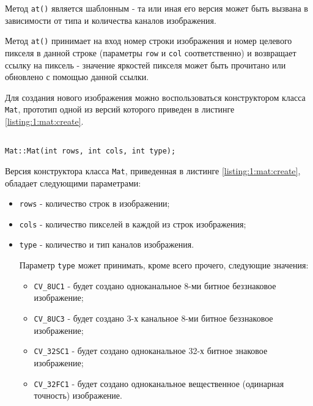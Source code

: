 Метод \verb|at()| является шаблонным - та или иная его версия может быть вызвана в зависимости от типа и количества каналов изображения.

Метод \verb|at()| принимает на вход номер строки изображения и номер целевого пикселя в данной строке (параметры \verb|row| и \verb|col| соответственно) и возвращает ссылку на пиксель - значение яркостей пикселя может быть прочитано или обновлено с помощью данной ссылки.


Для создания нового изображения можно воспользоваться конструктором класса \verb|Mat|, прототип одной из версий которого приведен в листинге \ref{listing:1:mat:create}.

\begin{lstlisting}

Mat::Mat(int rows, int cols, int type);

\end{lstlisting}
\mylistingend

Версия конструктора класса \verb|Mat|, приведенная в листинге \ref{listing:1:mat:create}, обладает следующими параметрами:

\begin{itemize}

	\item \verb|rows| - количество строк в изображении;
	\item \verb|cols| - количество пикселей в каждой из строк изображения;
	\item \verb|type| - количество и тип каналов изображения.

	Параметр \verb|type| может принимать, кроме всего прочего, следующие значения:

	\begin{itemize}

		\item \verb|CV_8UC1| - будет создано одноканальное 8-ми битное беззнаковое изображение;
		\item \verb|CV_8UC3| - будет создано 3-х канальное 8-ми битное беззнаковое изображение;
		\item \verb|CV_32SC1| - будет создано одноканальное 32-х битное знаковое изображение;
		\item \verb|CV_32FC1| - будет создано одноканальное вещественное (одинарная точность) изображение.

	\end{itemize}

\end{itemize}

